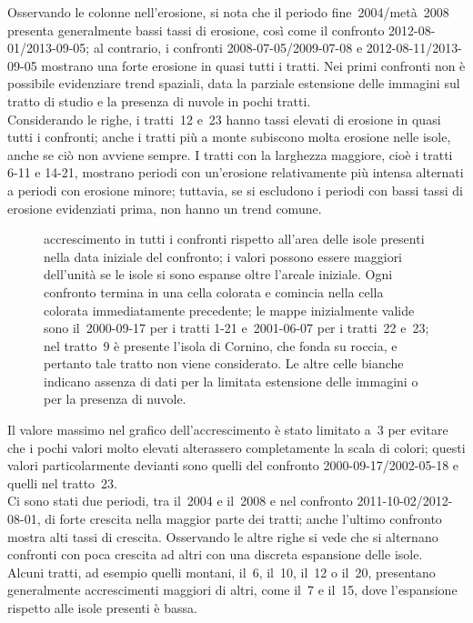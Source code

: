 Osservando le colonne nell'erosione, si nota che il periodo fine~2004/metà~2008 presenta generalmente bassi tassi di erosione, così come il confronto 2012-08-01/2013-09-05;
al contrario, i confronti 2008-07-05/2009-07-08 e 2012-08-11/2013-09-05 mostrano una forte erosione in quasi tutti i tratti.
Nei primi confronti non è possibile evidenziare trend spaziali, data la parziale estensione delle immagini sul tratto di studio e la presenza di nuvole in pochi tratti.
\\
Considerando le righe, i tratti~12 e~23 hanno tassi elevati di erosione in quasi tutti i confronti; anche i tratti più a monte subiscono molta erosione nelle isole, anche se ciò non avviene sempre.
I tratti con la larghezza maggiore, cioè i tratti 6-11 e 14-21, mostrano periodi con un'erosione relativamente più intensa alternati a periodi con erosione minore; tuttavia, se si escludono i periodi con bassi tassi di erosione evidenziati prima, non hanno un trend comune.
%
\begin{figure}
	\centering
	
	\caption[accrescimento in tutti i confronti rispetto all'area delle isole presenti inizialmente]{accrescimento in tutti i confronti rispetto all'area delle isole presenti nella data iniziale del confronto; i valori possono essere maggiori dell'unità se le isole si sono espanse oltre l'areale iniziale.
	Ogni confronto termina in una cella colorata e comincia nella cella colorata immediatamente precedente; le mappe inizialmente valide sono il~2000-09-17 per i tratti 1-21 e~2001-06-07 per i tratti~22 e~23; nel tratto~9 è presente l'isola di Cornino, che fonda su roccia, e pertanto tale tratto non viene considerato.
	Le altre celle bianche indicano assenza di dati per la limitata estensione delle immagini o per la presenza di nuvole.}
	\label{graph:accrescimento-matrix}
\end{figure}
%

Il valore massimo nel grafico dell'accrescimento è stato limitato a~\num{3} per evitare che i pochi valori molto elevati alterassero completamente la scala di colori; questi valori particolarmente devianti sono quelli del confronto 2000-09-17/2002-05-18 e quelli nel tratto~23.
\\
Ci sono stati due periodi, tra il~2004 e il~2008 e nel confronto 2011-10-02/2012-08-01, di forte crescita nella maggior parte dei tratti; anche l'ultimo confronto mostra alti tassi di crescita.
Osservando le altre righe si vede che si alternano confronti con poca crescita ad altri con una discreta espansione delle isole.
\\
Alcuni tratti, ad esempio quelli montani, il~6, il~10, il~12 o il~20, presentano generalmente accrescimenti maggiori di altri, come il~7 e il~15, dove l'espansione rispetto alle isole presenti è bassa.

